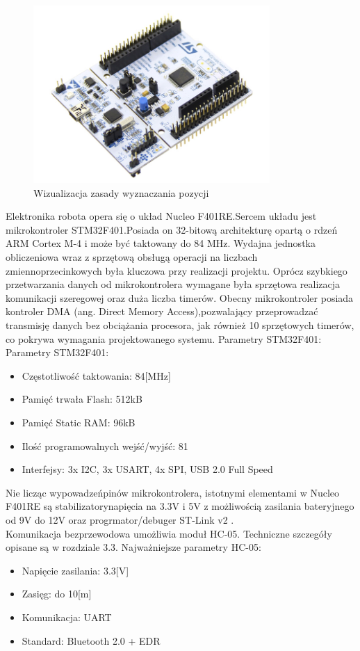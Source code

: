 \documentclass[eng,printmode]{mgr}
\begin{document}
  \begin{figure}[ht]
   \centering
   \includegraphics[width=9cm]{images/nucleo}
   \caption{Wizualizacja zasady wyznaczania pozycji}
   \label{fig:nucleo}
  \end{figure} 

Elektronika robota opera się o układ Nucleo F401RE.Sercem układu jest mikrokontroler STM32F401.Posiada on 32-bitową architekturę opartą o rdzeń ARM Cortex M-4 i może być taktowany do 84 MHz. Wydajna jednostka obliczeniowa wraz z sprzętową obsługą operacji na liczbach zmiennoprzecinkowych była kluczowa przy realizacji projektu.  Oprócz szybkiego przetwarzania danych od mikrokontrolera wymagane była sprzętowa realizacja komunikacji szeregowej oraz duża liczba timerów. Obecny mikrokontroler posiada kontroler DMA (ang. Direct Memory Access),pozwalający przeprowadzać transmisję danych bez obciążania procesora, jak również 10 sprzętowych timerów, co pokrywa wymagania projektowanego systemu.
Parametry STM32F401:
\newline Parametry STM32F401:
\begin{itemize}
  \item Częstotliwość taktowania: 84[MHz]
  \item Pamięć trwała Flash: 512kB
  \item Pamięć Static RAM: 96kB
  \item Ilość programowalnych wejść/wyjść: 81
  \item Interfejsy: 3x I2C, 3x USART, 4x SPI, USB 2.0 Full Speed
\end{itemize}

Nie licząc wypowadzeńpinów mikrokontrolera, istotnymi elementami w Nucleo F401RE są stabilizatorynapięcia na 3.3V i 5V z możliwością zasilania bateryjnego od 9V do 12V oraz progrmator/debuger ST-Link v2 . 
\\Komunikacja bezprzewodowa umożliwia moduł HC-05. Techniczne szczegóły opisane są w rozdziale 3.3. Najważniejsze parametry HC-05:
\begin{itemize}
  \item Napięcie zasilania: 3.3[V]
  \item Zasięg: do 10[m]
  \item Komunikacja: UART
  \item Standard: Bluetooth 2.0 + EDR
\end{itemize}
\end{document}
